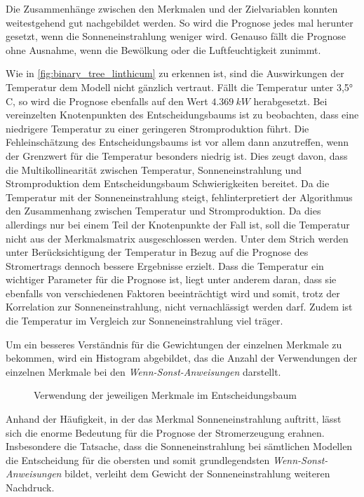 \documentclass[12pt, a4paper]{article}
\begin{document}
Die Zusammenhänge zwischen den Merkmalen und der Zielvariablen konnten weitestgehend gut nachgebildet werden. So wird die Prognose jedes mal herunter gesetzt, wenn die Sonneneinstrahlung weniger wird. Genauso fällt die Prognose ohne Ausnahme, wenn die Bewölkung oder die Luftfeuchtigkeit zunimmt. 

Wie in \autoref{fig:binary_tree_linthicum} zu erkennen ist, sind die Auswirkungen der Temperatur dem Modell nicht gänzlich vertraut. Fällt die Temperatur unter 3,5° C, so wird die Prognose ebenfalls auf den Wert $4.369\ kW$ herabgesetzt. Bei vereinzelten Knotenpunkten des Entscheidungsbaums ist zu beobachten, dass eine niedrigere Temperatur zu einer geringeren Stromproduktion führt. Die Fehleinschätzung des Entscheidungsbaums ist vor allem dann anzutreffen, wenn der Grenzwert für die Temperatur besonders niedrig ist. Dies zeugt davon, dass die Multikollinearität zwischen Temperatur, Sonneneinstrahlung und Stromproduktion dem Entscheidungsbaum Schwierigkeiten bereitet. Da die Temperatur mit der Sonneneinstrahlung steigt, fehlinterpretiert der Algorithmus den Zusammenhang zwischen Temperatur und Stromproduktion. Da dies allerdings nur bei einem Teil der Knotenpunkte der Fall ist, soll die Temperatur nicht aus der Merkmalsmatrix ausgeschlossen werden. Unter dem Strich werden unter Berücksichtigung der Temperatur in Bezug auf die Prognose des Stromertrags dennoch bessere Ergebnisse erzielt. Dass die Temperatur ein wichtiger Parameter für die Prognose ist, liegt unter anderem daran, dass sie ebenfalls von verschiedenen Faktoren beeinträchtigt wird und somit, trotz der Korrelation zur Sonneneinstrahlung, nicht vernachlässigt werden darf. Zudem ist die Temperatur im Vergleich zur Sonneneinstrahlung viel träger.

Um ein besseres Verständnis für die Gewichtungen der einzelnen Merkmale zu bekommen, wird ein Histogram abgebildet, das die Anzahl der Verwendungen der einzelnen Merkmale bei den \textit{Wenn-Sonst-Anweisungen} darstellt.

\begin{figure}[H]
\centering
\fontsize{20}{20}\selectfont
\def\svgwidth{400pt}

\caption{Verwendung der jeweiligen Merkmale im Entscheidungsbaum}
\label{fig:histogram_feature_quantity}
\end{figure}

Anhand der Häufigkeit, in der das Merkmal Sonneneinstrahlung auftritt, lässt sich die enorme Bedeutung für die Prognose der Stromerzeugung erahnen. Insbesondere die Tatsache, dass die Sonneneinstrahlung bei sämtlichen Modellen die Entscheidung für die obersten und somit grundlegendsten \textit{Wenn-Sonst-Anweisungen} bildet, verleiht dem Gewicht der Sonneneinstrahlung weiteren Nachdruck.
\end{document}
